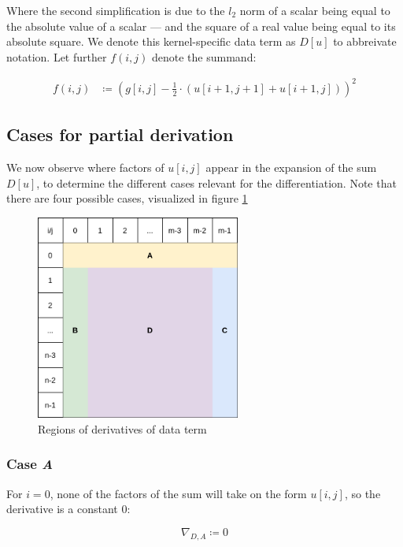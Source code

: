 \documentclass[a4paper]{scrreprt}
\begin{document}
Where the second simplification is due to the $l_2$ norm of a scalar being
equal to the absolute value of a scalar --- and the square of a real value
being equal to its absolute square. We denote this kernel-specific data term as
$D[u]$ to abbreivate notation. Let further $f(i, j)$ denote the summand:

\begin{align*}
		f(i, j) & \coloneqq \left(g[i, j] - \frac{1}{2} \cdot (u[i + 1, j + 1] + u[i + 1, j])\right)^2
\end{align*}

\subsection{Cases for partial derivation}

We now observe where factors of $u[i, j]$ appear in the expansion of the sum
$D[u]$, to determine the different cases relevant for the differentiation. Note
that there are four possible cases, visualized in figure
\ref{fig:data_term_derivatives}

\begin{figure}
		\centering
		\includegraphics[width=0.6\textwidth]{resources/data_term_derivatives.png}
		\caption{Regions of derivatives of data term}
		\label{fig:data_term_derivatives}
\end{figure}


\subsubsection{Case \emph{A}}

For $i = 0$, none of the factors of the sum will take on the form $u[i, j]$, so
the derivative is a constant $0$:

\[
		\nabla_{D, A} \coloneqq 0
\]
\end{document}
